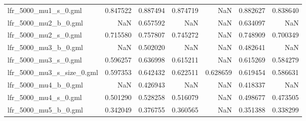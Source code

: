 \begin{tabular}{lrrrrrr}
lfr\_5000\_mu1\_s\_0.gml       &                            0.847522 &                       0.887494 &                          0.874719 &                           NaN &                        0.882627 &                                0.838640 \\
lfr\_5000\_mu2\_b\_0.gml       &                                 NaN &                       0.657592 &                               NaN &                           NaN &                        0.634097 &                                     NaN \\
lfr\_5000\_mu2\_s\_0.gml       &                            0.715580 &                       0.757807 &                          0.745272 &                           NaN &                        0.748909 &                                0.700349 \\
lfr\_5000\_mu3\_b\_0.gml       &                                 NaN &                       0.502020 &                               NaN &                           NaN &                        0.482641 &                                     NaN \\
lfr\_5000\_mu3\_s\_0.gml       &                            0.596257 &                       0.636998 &                          0.615211 &                           NaN &                        0.615269 &                                0.584279 \\
lfr\_5000\_mu3\_s\_size\_0.gml  &                            0.597353 &                       0.642432 &                          0.622511 &                      0.628659 &                        0.619454 &                                0.586631 \\
lfr\_5000\_mu4\_b\_0.gml       &                                 NaN &                       0.426943 &                               NaN &                           NaN &                        0.418337 &                                     NaN \\
lfr\_5000\_mu4\_s\_0.gml       &                            0.501290 &                       0.528258 &                          0.516079 &                           NaN &                        0.498677 &                                0.473505 \\
lfr\_5000\_mu5\_b\_0.gml       &                            0.342049 &                       0.376755 &                          0.360565 &                           NaN &                        0.351388 &                                0.338299 \\

\end{tabular}
